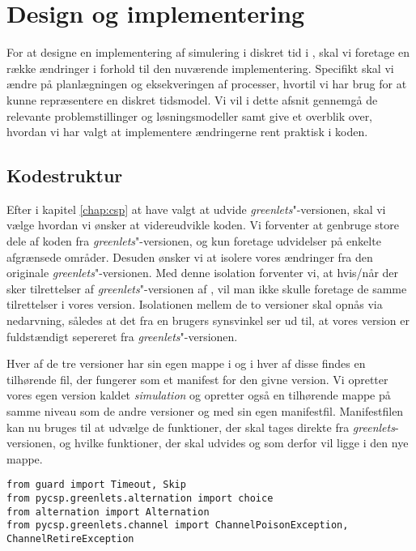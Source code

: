 
\section{Design og implementering}
For at designe en implementering af simulering i diskret tid i \pycsp, skal vi foretage en række ændringer i forhold til den nuværende implementering. Specifikt skal vi ændre på planlægningen og eksekveringen af processer, hvortil vi har brug for at kunne repræsentere en diskret tidsmodel. Vi vil i dette afsnit gennemgå de relevante problemstillinger og løsningsmodeller samt give et overblik over, hvordan vi har valgt at implementere ændringerne rent praktisk i koden. 


\subsection{Kodestruktur}  
Efter i kapitel \ref{chap:csp} at have valgt at udvide \emph{greenlets}"-versionen, skal vi vælge hvordan vi ønsker at videreudvikle koden. Vi forventer at genbruge store dele af koden fra \emph{greenlets}"-versionen, og kun foretage udvidelser på enkelte afgrænsede områder. Desuden ønsker vi at isolere vores ændringer fra den originale \emph{greenlets}"-versionen. Med denne isolation forventer vi, at hvis/når der sker tilrettelser af \emph{greenlets}"-versionen af \pycsp, vil man ikke skulle foretage de samme tilrettelser i vores version. 
Isolationen mellem de to versioner skal opnås via nedarvning, således at det fra en brugers synsvinkel ser ud til, at vores version er fuldstændigt sepereret fra \emph{greenlets}"-versionen.

Hver af de tre versioner har sin egen mappe i \pycsp og i hver af disse findes en tilhørende  fil, der fungerer som et manifest for den givne version. Vi opretter vores egen version kaldet \emph{simulation} og opretter også en tilhørende mappe på samme niveau som de andre versioner og med sin egen manifestfil. Manifestfilen kan nu bruges til at udvælge de funktioner, der skal tages direkte fra \emph{greenlets}-versionen, og hvilke funktioner, der skal udvides og som derfor vil ligge i den nye mappe.

\begin{lstlisting}[float=hbtp,label=fig:init,caption=Uddrag af \code{\_\_init\_\_.py} for simulationsversionen.]
from guard import Timeout, Skip
from pycsp.greenlets.alternation import choice
from alternation import Alternation
from pycsp.greenlets.channel import ChannelPoisonException, ChannelRetireException
\end{lstlisting}

